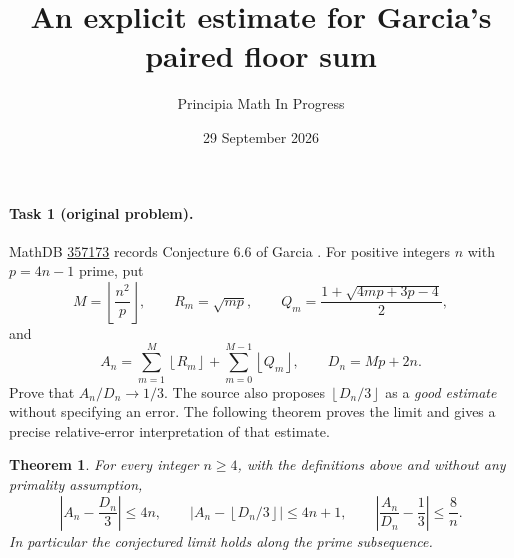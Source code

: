 \documentclass[11pt]{article}
\title{An explicit estimate for Garcia's paired floor sum}
\author{Principia Math In Progress}
\date{29 September 2026}
\newtheorem{theorem}{Theorem}
\newcommand{\fl}[1]{\left\lfloor #1\right\rfloor}
\begin{document}
\maketitle

\paragraph{Task 1 (original problem).}
MathDB \href{https://mathdb.com/p/357173}{357173} records Conjecture 6.6
of Garcia \cite[p.~30]{Garcia}. For positive integers \(n\) with
\(p=4n-1\) prime, put
\[
 M=\fl{\frac{n^2}{p}},\qquad R_m=\sqrt{mp},\qquad
 Q_m=\frac{1+\sqrt{4mp+3p-4}}2,
\]
and
\[
 A_n=\sum_{m=1}^M\fl{R_m}+\sum_{m=0}^{M-1}\fl{Q_m},
 \qquad D_n=Mp+2n.
\]
Prove that \(A_n/D_n\to1/3\). The source also proposes
\(\fl{D_n/3}\) as a \emph{good estimate} without specifying an error.
The following theorem proves the limit and gives a precise relative-error
interpretation of that estimate.

\begin{theorem}
For every integer \(n\ge4\), with the definitions above and without any
primality assumption,
\[
 \left|A_n-\frac{D_n}{3}\right|\le4n,\qquad
 \left|A_n-\fl{D_n/3}\right|\le4n+1,\qquad
 \left|\frac{A_n}{D_n}-\frac13\right|\le\frac8n.
\]
In particular the conjectured limit holds along the prime subsequence.
\end{theorem}
\end{document}
